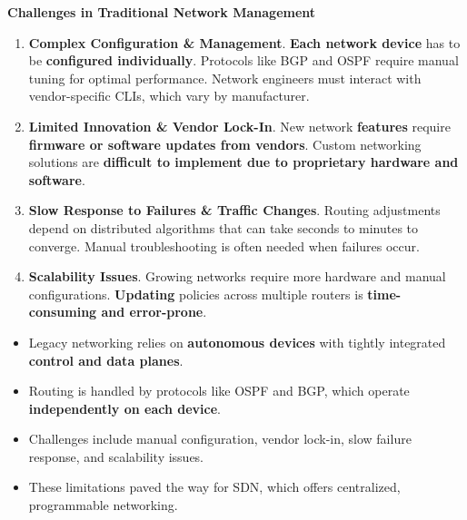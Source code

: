 \highspace
\begin{flushleft}
    \textcolor{Red2}{ \textbf{Challenges in Traditional Network Management}}
\end{flushleft}
\begin{enumerate}[label=\textcolor{Red2}{\faIcon{times}}]
    \item \textcolor{Red2}{\textbf{Complex Configuration \& Management}}. \textbf{Each network device} has to be \textbf{configured individually}. Protocols like BGP and OSPF require manual tuning for optimal performance. Network engineers must interact with vendor-specific CLIs, which vary by manufacturer.
    
    \item \textcolor{Red2}{\textbf{Limited Innovation \& Vendor Lock-In}}. New network \textbf{features} require \textbf{firmware or software updates from vendors}. Custom networking solutions are \textbf{difficult to implement due to proprietary hardware and software}.
    
    \item \textcolor{Red2}{\textbf{Slow Response to Failures \& Traffic Changes}}. Routing adjustments depend on distributed algorithms that can take seconds to minutes to converge. Manual troubleshooting is often needed when failures occur.
    
    \item \textcolor{Red2}{\textbf{Scalability Issues}}. Growing networks require more hardware and manual configurations. \textbf{Updating} policies across multiple routers is \textbf{time-consuming and error-prone}.
\end{enumerate}

\highspace
\begin{takeawaysbox}
    \begin{itemize}
        \item Legacy networking relies on \textbf{autonomous devices} with tightly integrated \textbf{control and data planes}.
        \item Routing is handled by protocols like OSPF and BGP, which operate \textbf{independently on each device}.
        \item Challenges include manual configuration, vendor lock-in, slow failure response, and scalability issues.
        \item These limitations paved the way for SDN, which offers centralized, programmable networking.
    \end{itemize}
\end{takeawaysbox}
